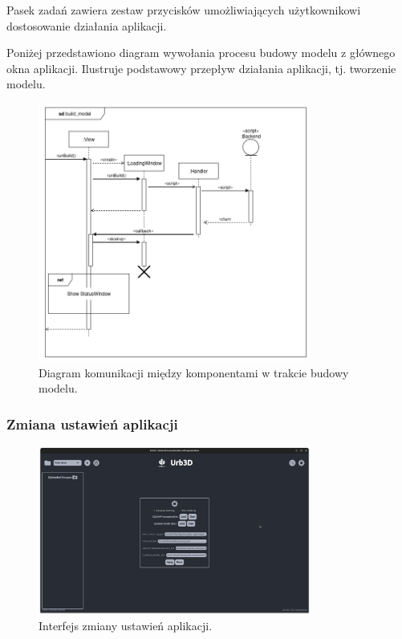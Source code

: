 Pasek zadań zawiera zestaw przycisków umożliwiających użytkownikowi dostosowanie działania aplikacji. 

Poniżej przedstawiono diagram wywołania procesu budowy modelu z głównego okna aplikacji. Ilustruje podstawowy przepływ działania aplikacji, tj. tworzenie modelu.

\begin{figure}[h!]
    \centering
    \includegraphics[width=0.8\textwidth]{img/diagramy/diagram_sekw_build.png}
    \caption{Diagram komunikacji między komponentami w trakcie budowy modelu.}
\end{figure}

\clearpage

\subsubsection{Zmiana ustawień aplikacji}
\begin{figure}[h!]
    \centering
    \includegraphics[width=0.8\textwidth]{img/wizualizacja/ui_ustawienia.png}
    \caption{Interfejs zmiany ustawień aplikacji.}
\end{figure}

